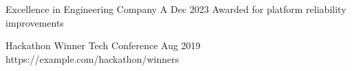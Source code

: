 %
%
%


\begin{awards}
  \awardentry
    {Excellence in Engineering}                      %
    {Company A}                                      %
    {Dec 2023}                                       %
    {Awarded for platform reliability improvements}  %
    {}                                               %

  \awardentry
    {Hackathon Winner}                               %
    {Tech Conference}                                %
    {Aug 2019}                                       %
    {}                                               %
    {https://example.com/hackathon/winners}          %
\end{awards}
